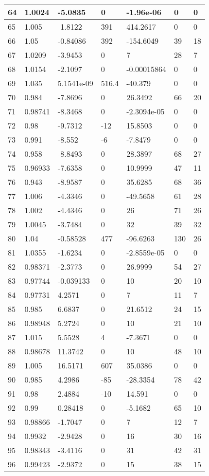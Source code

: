 \begin{tabular}{|l|l|l|l|l|l|l|}
64&1.0024&-5.0835&0&-1.96e-06&0&0\\\hline
65&1.005&-1.8122&391&414.2617&0&0\\\hline
66&1.05&-0.84086&392&-154.6049&39&18\\\hline
67&1.0209&-3.9453&0&7&28&7\\\hline
68&1.0154&-2.1097&0&-0.00015864&0&0\\\hline
69&1.035&5.1541e-09&516.4&-40.379&0&0\\\hline
70&0.984&-7.8696&0&26.3492&66&20\\\hline
71&0.98741&-8.3468&0&-2.3094e-05&0&0\\\hline
72&0.98&-9.7312&-12&15.8503&0&0\\\hline
73&0.991&-8.552&-6&-7.8479&0&0\\\hline
74&0.958&-8.8493&0&28.3897&68&27\\\hline
75&0.96933&-7.6358&0&10.9999&47&11\\\hline
76&0.943&-8.9587&0&35.6285&68&36\\\hline
77&1.006&-4.3346&0&-49.5658&61&28\\\hline
78&1.002&-4.4346&0&26&71&26\\\hline
79&1.0045&-3.7484&0&32&39&32\\\hline
80&1.04&-0.58528&477&-96.6263&130&26\\\hline
81&1.0355&-1.6234&0&-2.8559e-05&0&0\\\hline
82&0.98371&-2.3773&0&26.9999&54&27\\\hline
83&0.97744&-0.039133&0&10&20&10\\\hline
84&0.97731&4.2571&0&7&11&7\\\hline
85&0.985&6.6837&0&21.6512&24&15\\\hline
86&0.98948&5.2724&0&10&21&10\\\hline
87&1.015&5.5528&4&-7.3671&0&0\\\hline
88&0.98678&11.3742&0&10&48&10\\\hline
89&1.005&16.5171&607&35.0386&0&0\\\hline
90&0.985&4.2986&-85&-28.3354&78&42\\\hline
91&0.98&2.4884&-10&14.591&0&0\\\hline
92&0.99&0.28418&0&-5.1682&65&10\\\hline
93&0.98866&-1.7047&0&7&12&7\\\hline
94&0.9932&-2.9428&0&16&30&16\\\hline
95&0.98343&-3.4116&0&31&42&31\\\hline
96&0.99423&-2.9372&0&15&38&15\\\hline

\end{tabular}
